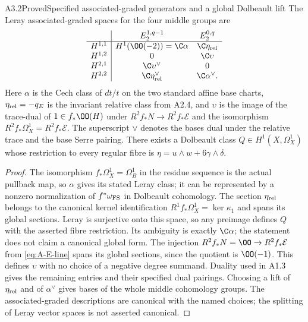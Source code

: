 \begin{claim}{A3.2}{Proved}{Specified associated-graded generators and a global Dolbeault lift}
The Leray associated-graded spaces for the four middle groups are
\[
\begin{array}{c|cc}
&E_2^{1,q-1}&E_2^{0,q}\\\hline
H^{1,1}&H^1(\OO(-2))=\C\alpha&\C\eta_{\rm rel}\\
H^{1,2}&0&\C\upsilon\\
H^{2,1}&\C\upsilon^\vee&0\\
H^{2,2}&\C\eta_{\rm rel}^\vee&\C\alpha^\vee.
\end{array}
\]
Here $\alpha$ is the Cech class of $dt/t$ on the two standard affine
base charts, $\eta_{\rm rel}=-q_E$ is the invariant relative class
from A2.4, and $\upsilon$ is the image of the trace-dual of
$1\in f_*\OO(H)$ under $R^2f_*N\to R^2f_*\mathcal E$ and the
isomorphism $R^2f_*\Omega_X^1=R^2f_*\mathcal E$.
The superscript $\vee$ denotes the bases dual under the relative
trace and the base Serre pairing.  There exists a Dolbeault class
$Q\in H^1(X,\Omega_X^1)$ whose restriction to every regular fibre
is $\eta=u\wedge w+6\gamma\wedge\delta$.
\end{claim}
\begin{proof}
The isomorphism $f_*\Omega_X^1=\Omega_B^1$ in the residue sequence
is the actual pullback map, so $\alpha$ gives its stated Leray
class; it can be represented by a nonzero normalization of
$f^*\omega_{\rm FS}$ in Dolbeault cohomology.  The section
$\eta_{\rm rel}$ belongs to the canonical kernel identification
$R^1f_*\Omega_X^1=\ker\kappa_1$ and spans its global sections.
Leray is surjective onto this space, so any preimage defines $Q$
with the asserted fibre restriction.  Its ambiguity is exactly
$\C\alpha$; the statement does not claim a canonical global form.
The injection $R^2f_*N=\OO\to R^2f_*\mathcal E$ from
\eqref{eq:A-E-line} spans its global sections, since the quotient
is $\OO(-1)$.  This defines $\upsilon$ with no choice of a negative
degree summand.  Duality used in A1.3 gives the remaining entries
and their specified dual pairings.  Choosing a lift of
$\eta_{\rm rel}$ and of $\alpha^\vee$ gives bases of the whole
middle cohomology groups.  The associated-graded descriptions are
canonical with the named choices; the splitting of Leray vector
spaces is not asserted canonical.
\end{proof}
